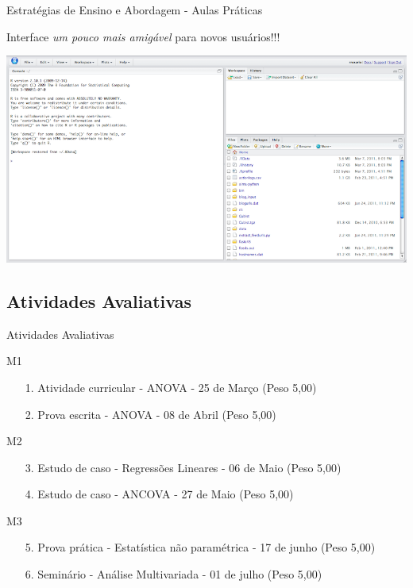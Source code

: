 \documentclass{bredelebeamer}
\begin{document}
\begin{frame}{Estratégias de Ensino e Abordagem - Aulas Práticas}

Interface \emph{um pouco mais amigável} para novos usuários!!!

\vspace{.2cm}

\begin{center}
\includegraphics[scale=0.3]{images/rstudio-prompt.png}
\end{center}
\end{frame}

\subsection{Atividades Avaliativas}

\begin{frame}{Atividades Avaliativas}

\begin{alertblock}{M1}
\begin{itemize}
\item[1.] Atividade curricular - ANOVA - 25 de Março (Peso 5,00)
\item[2.] Prova escrita - ANOVA - 08 de Abril (Peso 5,00)
\end{itemize}
\end{alertblock}

\begin{alertblock}{M2}
\begin{itemize}
\item[3.] Estudo de caso - Regressões Lineares - 06 de Maio (Peso 5,00)
\item[4.] Estudo de caso - ANCOVA - 27 de Maio (Peso 5,00)
\end{itemize}
\end{alertblock}

\begin{alertblock}{M3}
\begin{itemize}
\item[5.] Prova prática - Estatística não paramétrica - 17 de junho (Peso 5,00)
\item[6.] Seminário - Análise Multivariada - 01 de julho (Peso 5,00)
\end{itemize}
\end{alertblock}

\end{frame}
\end{document}
